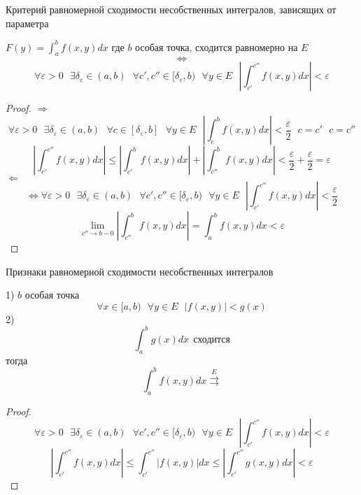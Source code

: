 \begin{title}[\Large]
   Критерий равномерной сходимости несобственных интегралов, зависящих от
   параметра
\end{title}

\begin{block}
  $F(y) = \int_a^b f(x,y) dx$ где $b$ особая точка, сходится равномерно на $E$
  $$
  \Leftrightarrow
  $$
  $$
  \forall \varepsilon > 0
  ~~~
  \exists \delta_{\varepsilon} \in (a,b)
  ~~~
  \forall c', c'' \in [\delta_{\varepsilon}, b)
  ~~~
  \forall y \in E
  ~~~
  \left|
    \int_{c'}^{c''} f(x,y) dx
  \right|
  < \varepsilon
  $$
\end{block}

\begin{proof}
  $\Rightarrow$
  $$
  \forall \varepsilon > 0
  ~~~
  \exists \delta_{\varepsilon} \in (a,b)
  ~~~
  \forall c \in [\delta_{\varepsilon}, b]
  ~~~
  \forall y \in E
  ~~~
  \left|
    \int_c^b f(x,y) dx
  \right|
  < \frac{\varepsilon}{2}
  ~~~
  c = c'
  ~~~
  c = c''
  $$
  $$
  \left|
    \int_{c'}^{c''} f(x,y) dx
  \right|
  \le
  \left|
    \int_{c'}^{b} f(x,y) dx
  \right|
  +
  \left|
    \int_{c''}^{b} f(x,y) dx
  \right|
  <
  \frac{\varepsilon}{2} + \frac{\varepsilon}{2} = \varepsilon
  $$
  $\Leftarrow$
  $$
  \Leftrightarrow
  \forall \varepsilon > 0
  ~~~
  \exists \delta_{\varepsilon} \in (a,b)
  ~~~
  \forall c', c'' \in [\delta_{\varepsilon}, b)
  ~~~
  \forall y \in E
  ~~~
  \left|
    \int_{c'}^{c''} f(x,y) dx
  \right|
  < \frac{\varepsilon}{2}
  $$
  $$
  \lim_{c'' \to b -0}
    \left|
      \int_{c''}^{b} f(x,y) dx
    \right|
  =
  \int_{a}^{b} f(x,y) dx
  < \varepsilon
  $$
\end{proof}

\begin{title}[\Large]
  Признаки равномерной сходимости несобственных интегралов
\end{title}

\begin{block}
  1)
  $b$ особая точка
  $$
  \forall  x \in [a, b)
  ~~~
  \forall y \in E
  ~~~
  |f(x, y)| < g(x)
  $$
  2)
  $$
  \int_a^b g(x) dx ~~ \text{сходится}
  $$
  тогда
  $$
  \int_a^b f(x,y) dx \stackrel{E}{\rightrightarrows}
  $$
\end{block}

\begin{proof}
  $$
  \forall \varepsilon > 0
  ~~~
  \exists \delta_{\varepsilon} \in (a,b)
  ~~~
  \forall c', c'' \in [\delta_{\varepsilon}, b)
  ~~~
  \forall y \in E
  ~~~
  \left|
    \int_{c'}^{c''} f(x,y) dx
  \right|
  < \varepsilon
  $$
  $$
  \left|
    \int_{c'}^{c''} f(x,y) dx
  \right|
  \le
  \int_{c'}^{c''} |f(x,y)| dx
  \le
  \left|
    \int_{c'}^{c''} g(x,y) dx
  \right|
  < \varepsilon
  $$
\end{proof}

